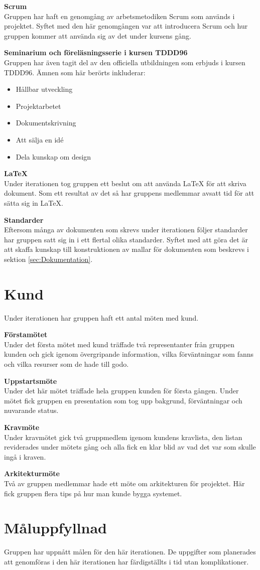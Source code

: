 \documentclass[a4paper,10pt, twoside]{article}
\begin{document}
\textbf{Scrum}\\ Gruppen har haft en genomgång av arbetsmetodiken Scrum som används i projektet. Syftet med den här genomgången var att introducera Scrum och hur gruppen kommer att använda sig av det under kursens gång.

\textbf{Seminarium och föreläsningsserie i kursen TDDD96}\\ Gruppen har även tagit del av den officiella utbildningen som erbjuds i kursen TDDD96. Ämnen som här berörts inkluderar:
\begin{itemize}
    \item Hållbar utveckling
    \item Projektarbetet
    \item Dokumentskrivning
    \item Att sälja en idé
    \item Dela kunskap om design
\end{itemize}

\textbf{\LaTeX}\\ Under iterationen tog gruppen ett beslut om att använda LaTeX för att skriva dokument. Som ett resultat av det så har gruppens medlemmar avsatt tid för att sätta sig in LaTeX.

\textbf{Standarder}\\ Eftersom många av dokumenten som skrevs under iterationen följer standarder har gruppen satt sig in i ett flertal olika standarder. Syftet med att göra det är att skaffa kunskap till konstruktionen av mallar för dokumenten som beskrevs i sektion \ref{sec:Dokumentation}.

\section{Kund}
Under iterationen har gruppen haft ett antal möten med kund.

\textbf{Förstamötet}\\
Under det första mötet med kund träffade två representanter från gruppen kunden och gick igenom övergripande information, vilka förväntningar som fanns och vilka resurser som de hade till godo.

\textbf{Uppstartsmöte}\\
Under det här mötet träffade hela gruppen kunden för första gången. Under mötet fick gruppen en presentation som tog upp bakgrund, förväntningar och nuvarande status.

\textbf{Kravmöte}\\
Under kravmötet gick två gruppmedlem igenom kundens kravlista, den listan reviderades under mötets gång och alla fick en klar blid av vad det var som skulle ingå i kraven.

\textbf{Arkitekturmöte}\\
Två av gruppen medlemmar hade ett möte om arkitekturen för projektet. Här fick gruppen flera tips på hur man kunde bygga systemet.

\section{Måluppfyllnad}
Gruppen har uppnått målen för den här iterationen. De uppgifter som planerades att genomföras i den här iterationen har färdigställts i tid utan komplikationer.
\end{document}
